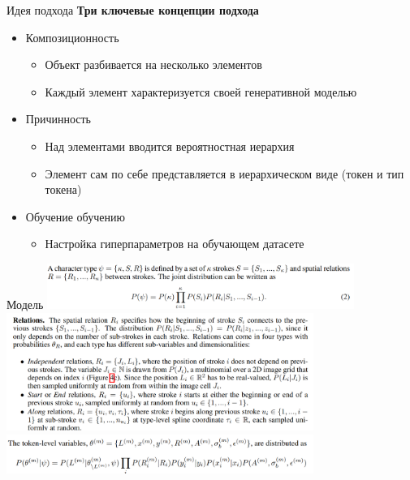 \documentclass[usenames,dvipsnames,10pt,pdf,utf8,russian,aspectratio=43]{beamer}
\begin{document}
\begin{frame}{Идея подхода}
\textbf{Три ключевые концепции подхода}
\begin{itemize}
\item Композиционность
\begin{itemize}
\item Объект разбивается на несколько элементов
\item Каждый элемент характеризуется своей генеративной моделью
\end{itemize}

\item Причинность
\begin{itemize}
\item Над элементами вводится вероятностная иерархия
\item Элемент сам по себе представляется в иерархическом виде (токен и тип токена)
\end{itemize}

\item Обучение обучению
\begin{itemize}
\item Настройка гиперпараметров на обучающем датасете 
\end{itemize}


\end{itemize}
\end{frame}

\begin{frame}{Модель}
\centering
\includegraphics[width=0.75\textwidth]{bp1.png}
\centering
\includegraphics[width=0.75\textwidth]{bp2.png}
\centering
\includegraphics[width=0.75\textwidth]{bp3.png}

\end{frame}
\end{document}
